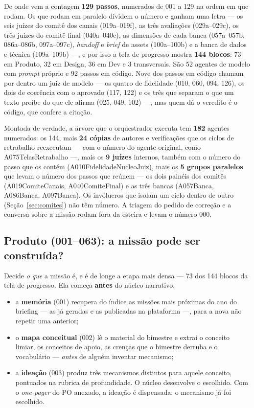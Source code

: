 \documentclass[11pt,a4paper]{article}
\newcommand{\cod}[1]{{\ttfamily\small #1}}
\begin{document}
\begin{caixaNorma}{De onde vem a contagem}
\textbf{129 passos}, numerados de 001 a 129 na ordem em que rodam. Os que rodam em paralelo dividem o número e ganham uma letra --- os seis juízes do comitê dos canais (019a--019f), as três avaliações (029a--029c), os três juízes do comitê final (040a--040c), as dimensões de cada banca (057a--057b, 086a--086b, 097a--097c), \emph{handoff} e \emph{brief} de assets (100a--100b) e a banca de dados e técnica (109a--109b) ---, e por isso a tela de progresso mostra \textbf{144 blocos}: 73 em Produto, 32 em Design, 36 em Dev e 3 transversais. São 52 agentes de modelo com \emph{prompt} próprio e 92 passos em código. Nove dos passos em código chamam por dentro um juiz de modelo --- os quatro de fidelidade (010, 060, 094, 126), os dois de coerência com o aprovado (117, 122) e os três que separam o que um texto proíbe do que ele afirma (025, 049, 102) ---, mas quem dá o veredito é o código, que confere a citação.

Montada de verdade, a árvore que o orquestrador executa tem \textbf{182} agentes numerados: os 144, mais \textbf{24 cópias} de autores e verificações que os ciclos de retrabalho reexecutam --- com o número do agente original, como \cod{A075TelasRetrabalho} ---, mais os \textbf{9 juízes} internos, também com o número do passo que os contém (\cod{A010FidelidadeNucleoJuiz}), mais os \textbf{5 grupos paralelos} que levam o número dos passos que reúnem --- os dois painéis dos comitês (\cod{A019ComiteCanais}, \cod{A040ComiteFinal}) e as três bancas (\cod{A057Banca}, \cod{A086Banca}, \cod{A097Banca}). Os invólucros que isolam um ciclo dentro de outro (Seção~\ref{sec:comites}) não têm número. A triagem do pedido de correção e a conversa sobre a missão rodam fora da esteira e levam o número 000.
\end{caixaNorma}

\subsection{Produto (001--063): a missão pode ser construída?}

Decide \emph{o que} a missão é, e é de longe a etapa mais densa --- 73 dos 144 blocos da tela de progresso. Ela começa \textbf{antes} do núcleo narrativo:

\begin{itemize}
  \item a \textbf{memória} (001) recupera do índice as missões mais próximas do ano do briefing --- as já geradas e as publicadas na plataforma ---, para a nova não repetir uma anterior;
  \item o \textbf{mapa conceitual} (002) lê o material do bimestre e extrai o conceito limiar, os conceitos de apoio, as crenças que o bimestre derruba e o vocabulário --- \emph{antes} de alguém inventar mecanismo;
  \item a \textbf{ideação} (003) produz três mecanismos distintos para aquele conceito, pontuados na rubrica de profundidade. O núcleo desenvolve o escolhido. Com o \emph{one-pager} do PO anexado, a ideação é dispensada: o mecanismo já foi escolhido.
\end{itemize}
\end{document}
